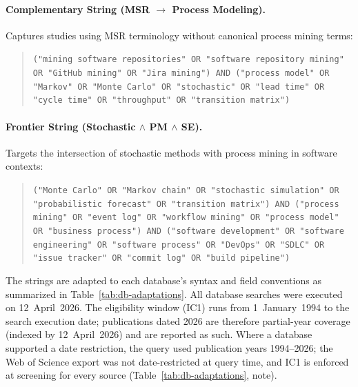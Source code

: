 \paragraph{Complementary String (MSR $\rightarrow$ Process Modeling).}
Captures studies using MSR terminology without canonical process mining terms:

\begin{quote}
\small
\texttt{("mining software repositories" OR "software repository mining" OR
"GitHub mining" OR "Jira mining") AND ("process model" OR "Markov" OR "Monte
Carlo" OR "stochastic" OR "lead time" OR "cycle time" OR "throughput" OR
"transition matrix")}
\end{quote}

\paragraph{Frontier String (Stochastic $\wedge$ PM $\wedge$ SE).}
Targets the intersection of stochastic methods with process mining in software
contexts:

\begin{quote}
\small
\texttt{("Monte Carlo" OR "Markov chain" OR "stochastic simulation" OR
"probabilistic forecast" OR "transition matrix") AND ("process mining" OR
"event log" OR "workflow mining" OR "process model" OR "business process") AND
("software development" OR "software engineering" OR "software process" OR
"DevOps" OR "SDLC" OR "issue tracker" OR "commit log" OR "build pipeline")}
\end{quote}

The strings are adapted to each database's syntax and field conventions as
summarized in Table~\ref{tab:db-adaptations}. All database searches were
executed on 12~April~2026. The eligibility window (IC1) runs from
1~January~1994 to the search execution date; publications dated 2026 are
therefore partial-year coverage (indexed by 12~April~2026) and are reported
as such. Where a database supported a date restriction, the query used
publication years 1994--2026; the Web of Science export was not
date-restricted at query time, and IC1 is enforced at screening for every
source (Table~\ref{tab:db-adaptations}, note).

